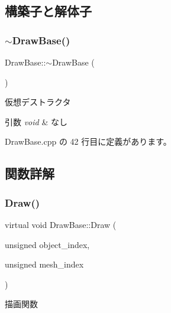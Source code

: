 \subsection{構築子と解体子}
\mbox{\label{class_draw_base_af276fa23e7c5f51a4fdeab016456a992}} 
\subsubsection{\texorpdfstring{$\sim$\+Draw\+Base()}{~DrawBase()}}
{\footnotesize\ttfamily Draw\+Base\+::$\sim$\+Draw\+Base (\begin{DoxyParamCaption}{ }\end{DoxyParamCaption})\hspace{0.3cm}{\ttfamily [pure virtual]}}



仮想デストラクタ 


\begin{DoxyParams}{引数}
{\em void} & なし \\
\hline
\end{DoxyParams}


 Draw\+Base.\+cpp の 42 行目に定義があります。



\subsection{関数詳解}
\mbox{\label{class_draw_base_a408080106630a1146d7af0bb46a4d8d1}} 
\subsubsection{\texorpdfstring{Draw()}{Draw()}}
{\footnotesize\ttfamily virtual void Draw\+Base\+::\+Draw (\begin{DoxyParamCaption}\item[{unsigned}]{object\+\_\+index,  }\item[{unsigned}]{mesh\+\_\+index }\end{DoxyParamCaption})\hspace{0.3cm}{\ttfamily [pure virtual]}}



描画関数 


